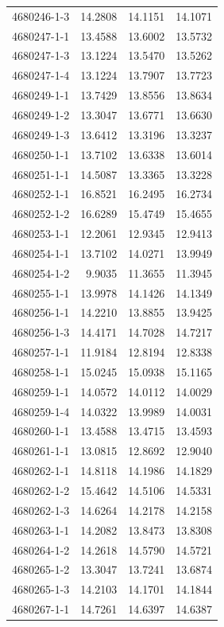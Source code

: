\begin{longtable}{lrrr}
4680246-1-3 & 14.2808 & 14.1151 & 14.1071 \\
4680247-1-1 & 13.4588 & 13.6002 & 13.5732 \\
4680247-1-3 & 13.1224 & 13.5470 & 13.5262 \\
4680247-1-4 & 13.1224 & 13.7907 & 13.7723 \\
4680249-1-1 & 13.7429 & 13.8556 & 13.8634 \\
4680249-1-2 & 13.3047 & 13.6771 & 13.6630 \\
4680249-1-3 & 13.6412 & 13.3196 & 13.3237 \\
4680250-1-1 & 13.7102 & 13.6338 & 13.6014 \\
4680251-1-1 & 14.5087 & 13.3365 & 13.3228 \\
4680252-1-1 & 16.8521 & 16.2495 & 16.2734 \\
4680252-1-2 & 16.6289 & 15.4749 & 15.4655 \\
4680253-1-1 & 12.2061 & 12.9345 & 12.9413 \\
4680254-1-1 & 13.7102 & 14.0271 & 13.9949 \\
4680254-1-2 & 9.9035 & 11.3655 & 11.3945 \\
4680255-1-1 & 13.9978 & 14.1426 & 14.1349 \\
4680256-1-1 & 14.2210 & 13.8855 & 13.9425 \\
4680256-1-3 & 14.4171 & 14.7028 & 14.7217 \\
4680257-1-1 & 11.9184 & 12.8194 & 12.8338 \\
4680258-1-1 & 15.0245 & 15.0938 & 15.1165 \\
4680259-1-1 & 14.0572 & 14.0112 & 14.0029 \\
4680259-1-4 & 14.0322 & 13.9989 & 14.0031 \\
4680260-1-1 & 13.4588 & 13.4715 & 13.4593 \\
4680261-1-1 & 13.0815 & 12.8692 & 12.9040 \\
4680262-1-1 & 14.8118 & 14.1986 & 14.1829 \\
4680262-1-2 & 15.4642 & 14.5106 & 14.5331 \\
4680262-1-3 & 14.6264 & 14.2178 & 14.2158 \\
4680263-1-1 & 14.2082 & 13.8473 & 13.8308 \\
4680264-1-2 & 14.2618 & 14.5790 & 14.5721 \\
4680265-1-2 & 13.3047 & 13.7241 & 13.6874 \\
4680265-1-3 & 14.2103 & 14.1701 & 14.1844 \\
4680267-1-1 & 14.7261 & 14.6397 & 14.6387 \\

\end{longtable}
